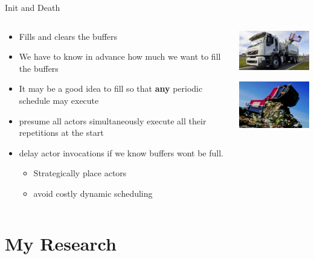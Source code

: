 \documentclass{beamer}
\begin{document}
\begin{frame}{Init and Death}
\begin{columns}
\begin{column}{6cm}
\begin{itemize}
	\item Fills and clears the buffers
	\item We have to know in advance how much we want to fill the buffers
	\item It may be a good idea to fill so that {\bf any} periodic schedule may execute
	\item presume all actors simultaneously execute all their repetitions at the start
	\item delay actor invocations if we know buffers wont be full.
	\begin{itemize}
		\item Strategically place actors
		\item avoid costly dynamic scheduling
	\end{itemize}
\end{itemize}
\end{column}
\begin{column}{4cm}
\includegraphics[width=4cm]{../res/garbage-in.jpg}

\includegraphics[width=4cm]{../res/GarbageOut.jpg}
\end{column}
\end{columns}
\end{frame}

\section{My Research}
\end{document}
